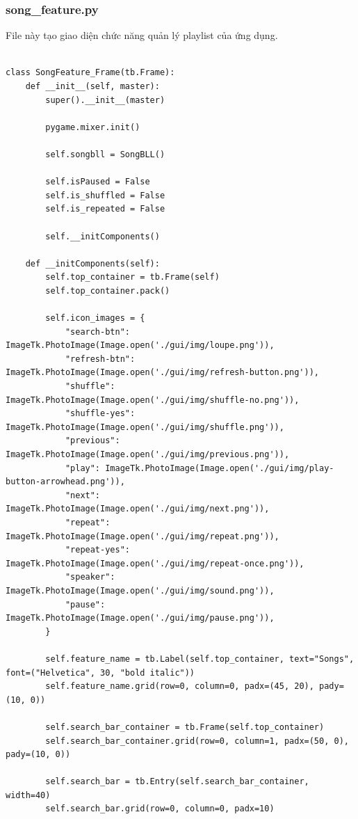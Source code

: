 \documentclass[a4paper]{article}
\begin{document}
\subsubsection{song\_feature.py}
File này tạo giao diện chức năng quản lý playlist của ứng dụng.
\begin{mdframed}[hidealllines=true,backgroundcolor=magenta!10]
\begin{lstlisting}

class SongFeature_Frame(tb.Frame):
    def __init__(self, master):
        super().__init__(master)

        pygame.mixer.init()

        self.songbll = SongBLL()

        self.isPaused = False
        self.is_shuffled = False
        self.is_repeated = False

        self.__initComponents()

    def __initComponents(self):
        self.top_container = tb.Frame(self)
        self.top_container.pack()

        self.icon_images = {
            "search-btn": ImageTk.PhotoImage(Image.open('./gui/img/loupe.png')),
            "refresh-btn": ImageTk.PhotoImage(Image.open('./gui/img/refresh-button.png')),
            "shuffle": ImageTk.PhotoImage(Image.open('./gui/img/shuffle-no.png')),
            "shuffle-yes": ImageTk.PhotoImage(Image.open('./gui/img/shuffle.png')),
            "previous": ImageTk.PhotoImage(Image.open('./gui/img/previous.png')),
            "play": ImageTk.PhotoImage(Image.open('./gui/img/play-button-arrowhead.png')),
            "next": ImageTk.PhotoImage(Image.open('./gui/img/next.png')),
            "repeat": ImageTk.PhotoImage(Image.open('./gui/img/repeat.png')),
            "repeat-yes": ImageTk.PhotoImage(Image.open('./gui/img/repeat-once.png')),
            "speaker": ImageTk.PhotoImage(Image.open('./gui/img/sound.png')),
            "pause": ImageTk.PhotoImage(Image.open('./gui/img/pause.png')),
        }

        self.feature_name = tb.Label(self.top_container, text="Songs", font=("Helvetica", 30, "bold italic"))
        self.feature_name.grid(row=0, column=0, padx=(45, 20), pady=(10, 0))

        self.search_bar_container = tb.Frame(self.top_container)
        self.search_bar_container.grid(row=0, column=1, padx=(50, 0), pady=(10, 0))

        self.search_bar = tb.Entry(self.search_bar_container, width=40)
        self.search_bar.grid(row=0, column=0, padx=10)


\end{lstlisting}
\end{mdframed}
\end{document}
